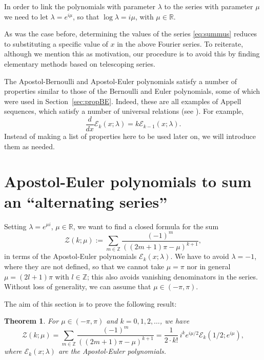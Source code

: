 \documentclass[11pt, oneside]{article}
\newcommand{\Z}{\mathbb{Z}}
\newcommand{\R}{\mathbb{R}}
\newcommand{\calE}{\mathcal{E}}
\newcommand{\calZ}{\mathcal{Z}}
\theoremstyle{plain}
\newtheorem{theorem}{Theorem}
\theoremstyle{definition}
\begin{document}
In order to link the polynomials with parameter $\lambda$ to the series with parameter $\mu$ we need to let $\lambda=e^{i\mu}$, so that $\log\lambda = i\mu$, with $\mu \in \R$. 

As was the case before, determining the values of the series \eqref{eq:summus} reduces to substituting a specific value of $x$ in the above Fourier series. To reiterate, although we mention this as motivation, our procedure is to avoid this by finding elementary methods based on telescoping series.

The Apostol-Bernoulli and Apostol-Euler polynomials satisfy a number of properties similar to those of the Bernoulli and Euler polynomials, some of which were used in Section~\ref{sec:propBE}. Indeed, these are all examples of Appell sequences, which satisfy a number of universal relations (see \cite{NRV, NRV18, NRV19, NRV-Brno}). For example,
\[
  \frac{d}{dx} \calE_k(x;\lambda) = k \calE_{k-1}(x;\lambda).
\]
Instead of making a list of properties here to be used later on, we will introduce them as needed.

\section{Apostol-Euler polynomials to sum an ``alternating series''}
\label{sec:mualt}

Setting $\lambda = e^{\mu i}$, $\mu \in \R$, we want to find a closed formula for the sum
\begin{equation}
\label{eq:calZ}
  \calZ(k;\mu) := \sum_{m\in\Z} \frac{(-1)^m}{((2m+1)\pi - \mu)^{k+1}},
\end{equation}
in terms of the Apostol-Euler polynomials $\calE_k(x;\lambda)$. We have to avoid $\lambda = -1$, where they are not defined, so that we cannot take $\mu=\pi$ nor in general $\mu=(2l+1)\pi$ with $l \in \Z$;
this also avoids vanishing denominators in the series. Without loss of generality, we can assume that $\mu \in (-\pi,\pi)$.

The aim of this section is to prove the following result:

\begin{theorem}
\label{teo:summu}
For $\mu \in (-\pi,\pi)$ and $k=0,1,2,\dots$, we have
\begin{equation}
\label{eq:summu}
  \calZ(k;\mu) = \sum_{m\in\Z} \frac{(-1)^m}{((2m+1)\pi - \mu)^{k+1}}
  = \frac{1}{2 \cdot k!} \, i^k  e^{i\mu/2} \calE_{k}(1/2;e^{i\mu}),
\end{equation}
where $\calE_{k}(x;\lambda)$ are the Apostol-Euler polynomials.
\end{theorem}
\end{document}
